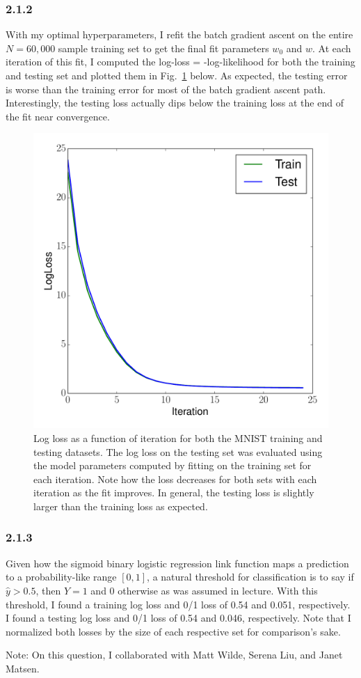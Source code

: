 \documentclass[12pt]{amsart}
\begin{document}
\subsubsection*{2.1.2}
With my optimal hyperparameters, I refit the batch gradient ascent on the entire $N = 60,000$ sample training set to get the final fit parameters $w_0$ and $\hat{w}$.  At each iteration of this fit, I computed the log-loss = -log-likelihood for both the training and testing set and plotted them in Fig.~\ref{fig:mnist_ll} below.  As expected, the testing error is worse than the training error for most of the batch gradient ascent path.  Interestingly, the testing loss actually dips below the training loss at the end of the fit near convergence.
\begin{figure}[H]
	\includegraphics[width=\columnwidth]{mnist_train_test_ll.pdf}
    \caption{Log loss as a function of iteration for both the MNIST training and testing datasets.  The log loss on the testing set was evaluated using the model parameters computed by fitting on the training set for each iteration.  Note how the loss decreases for both sets with each iteration as the fit improves.  In general, the testing loss is slightly larger than the training loss as expected.}
    \label{fig:mnist_ll}
\end{figure}

\subsubsection*{2.1.3}
Given how the sigmoid binary logistic regression link function maps a prediction to a probability-like range $[0,1]$, a natural threshold for classification is to say if $\hat{y} > 0.5$, then $Y = 1$ and 0 otherwise as was assumed in lecture.  With this threshold, I found a training log loss and 0/1 loss of 0.54 and 0.051, respectively.  I found a testing log loss and 0/1 loss of 0.54 and 0.046, respectively.  Note that I normalized both losses by the size of each respective set for comparison's sake.

Note: On this question, I collaborated with Matt Wilde, Serena Liu, and Janet Matsen.
\end{document}
